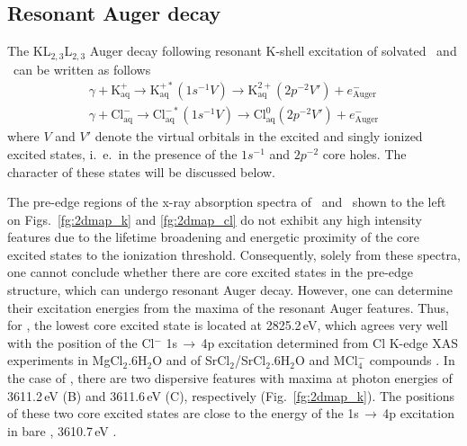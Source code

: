 \subsection{Resonant Auger decay} \label{ssec:ra}


The KL$_{2,3}$L$_{2,3}$ Auger decay following resonant K-shell excitation of solvated \ki~and \cli~can be written as follows
%
\begin{align*}
\gamma + \text{K}^{+}_{\text{aq}} \rightarrow \text{K}^{+*}_{\text{aq}} (1s^{-1}V) \rightarrow \text{K}^{2+}_{\text{aq}} (2p^{-2}V') + e^{-}_{\text{Auger}}\\
\gamma + \text{Cl}^{-}_{\text{aq}} \rightarrow \text{Cl}^{-*}_{\text{aq}} (1s^{-1}V) \rightarrow \text{Cl}^{0}_{\text{aq}}(2p^{-2}V') + e^{-}_{\text{Auger}}
\end{align*}
%
where $V$ and $V'$ denote the virtual orbitals in the excited and singly ionized excited states, i.\ e.\ in the presence of the $1s^{-1}$ and $2p^{-2}$ core holes. The character of these states will be discussed below.


The pre-edge regions of the x-ray absorption spectra of \ki~and \cli~shown to the left on Figs.\ \ref{fg:2dmap_k} and \ref{fg:2dmap_cl} do not exhibit any high intensity features due to the lifetime broadening and energetic proximity of the core excited states to the ionization threshold. Consequently, solely from these spectra, one cannot conclude whether there are core excited states in the pre-edge structure, which can undergo resonant Auger decay. However, one can determine their excitation energies from the maxima of the resonant Auger features. Thus, for \cli, the lowest core excited state is located at 2825.2\,eV, which agrees very well with the position of the Cl$^{-}$ 1s$\,\rightarrow\,$4p excitation determined from Cl K-edge XAS experiments in MgCl$_2$.6H$_2$O and of SrCl$_2$/SrCl$_2$.6H$_2$O \citep{sugiura82:681} and MCl$_{4}^{-}$ compounds \citep{shadle95:2259}. In the case of \ki, there are two dispersive features with maxima at photon energies of 3611.2\,eV (B) and 3611.6\,eV (C), respectively (Fig.\ \ref{fg:2dmap_k}). The positions of these two core excited states are close to the energy of the 1s$\,\rightarrow\,$4p excitation in bare \ki, 3610.7\,eV \citep{hertlein06:062715}.


